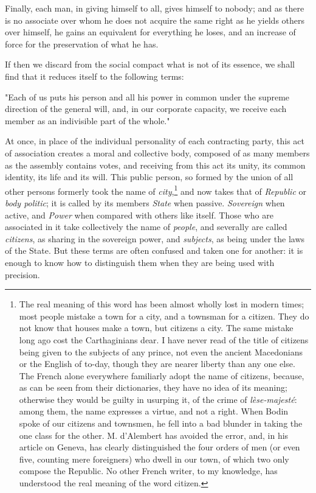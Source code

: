 \documentclass[12pt]{report}
\begin{document}
Finally, each man, in giving himself to all, gives himself to nobody; and as there is no associate over whom he does not acquire the same right as he yields others over himself, he gains an equivalent for everything he loses, and an increase of force for the preservation of what he has.

If then we discard from the social compact what is not of its essence, we shall find that it reduces itself to the following terms:
\begin{displayquote}
"Each of us puts his person and all his power in common under the supreme direction of the general will, and, in our corporate capacity, we receive each member as an indivisible part of the whole."
\end{displayquote}
At once, in place of the individual personality of each contracting party, this act of association creates a moral and collective body, composed of as many members as the assembly contains votes, and receiving from this act its unity, its common identity, its life and its will. This public person, so formed by the union of all other persons formerly took the name of \textit{city},\footnote{The real meaning of this word has been almost wholly lost in modern times; most people mistake a town for a city, and a townsman for a citizen. They do not know that houses make a town, but citizens a city. The same mistake long ago cost the Carthaginians dear. I have never read of the title of citizens being given to the subjects of any prince, not even the ancient Macedonians or the English of to-day, though they are nearer liberty than any one else. The French alone everywhere familiarly adopt the name of citizens, because, as can be seen from their dictionaries, they have no idea of its meaning; otherwise they would be guilty in usurping it, of the crime of \textit{l\`{e}se-majest\'{e}}: among them, the name expresses a virtue, and not a right. When Bodin spoke of our citizens and townsmen, he fell into a bad blunder in taking the one class for the other. M. d'Alembert has avoided the error, and, in his article on Geneva, has clearly distinguished the four orders of men (or even five, counting mere foreigners) who dwell in our town, of which two only compose the Republic. No other French writer, to my knowledge, has understood the real meaning of the word citizen.} and now takes that of \textit{Republic} or \textit{body politic}; it is called by its members \textit{State} when passive. \textit{Sovereign} when active, and \textit{Power} when compared with others like itself. Those who are associated in it take collectively the name of \textit{people}, and severally are called \textit{citizens}, as sharing in the sovereign power, and \textit{subjects}, as being under the laws of the State. But these terms are often confused and taken one for another: it is enough to know how to distinguish them when they are being used with precision.
\end{document}
